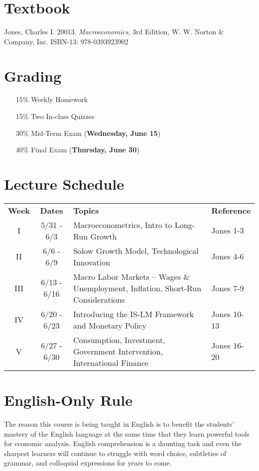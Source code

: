 \documentclass{article}
\begin{document}
\section*{Textbook}

Jones, Charles I. 20013. \textit{Macroeconomics}, 3rd Edition, W. W. Norton \& Company, Inc. ISBN-13: 978-0393923902

\section*{Grading}

\begin{itemize}
\item [15\%] Weekly Homework
\item [15\%] Two In-class Quizzes
\item [30\%] Mid-Term Exam (\textbf{Wednesday, June 15})
\item [40\%] Final Exam (\textbf{Thursday, June 30})
\end{itemize}

\section*{Lecture Schedule}

\begin{table}[h]
\centering
\begin{tabular}{c c p{6cm} l}
\textbf{Week} & \textbf{Dates} & \textbf{Topics} & \textbf{Reference} \\
I & 5/31 - 6/3 & Macroeconometrics, Intro to Long-Run Growth & Jones 1-3 \\
II & 6/6 - 6/9 & Solow Growth Model, Technological Innovation & Jones 4-6 \\
III & 6/13 - 6/16 & Macro Labor Markets -- Wages \& Unemployment, Inflation, Short-Run Considerations & Jones 7-9 \\
IV & 6/20 - 6/23 & Introducing the IS-LM Framework and Monetary Policy & Jones 10-13 \\ 
V & 6/27 - 6/30 & Consumption, Investment, Government Intervention, International Finance & Jones 16-20 \\
\end{tabular}
\end{table}

\section*{English-Only Rule}
The reason this course is being taught in English is to benefit the students' mastery of the English language at the same time that they learn powerful tools for economic analysis. English comprehension is a daunting task and even the sharpest learners will continue to struggle with word choice, subtleties of grammar, and colloquial expressions for years to come.
\end{document}
